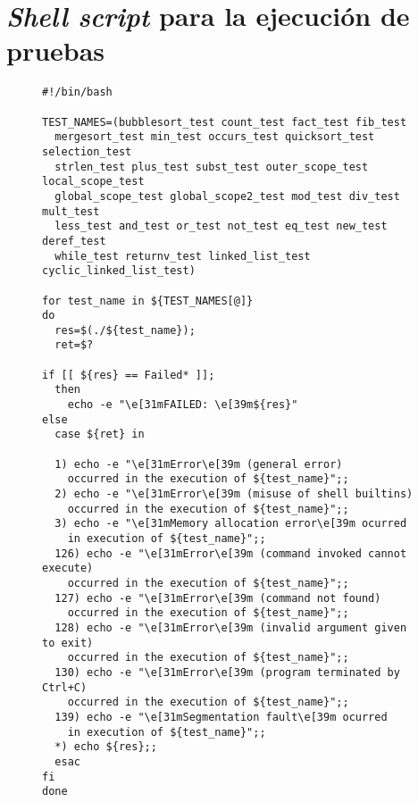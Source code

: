 \chapter{\textit{Shell script} para la ejecución de pruebas}
\label{ap:bash_script}

\begin{figure}
\begin{lstlisting}
#!/bin/bash

TEST_NAMES=(bubblesort_test count_test fact_test fib_test
  mergesort_test min_test occurs_test quicksort_test selection_test
  strlen_test plus_test subst_test outer_scope_test local_scope_test
  global_scope_test global_scope2_test mod_test div_test mult_test
  less_test and_test or_test not_test eq_test new_test deref_test
  while_test returnv_test linked_list_test cyclic_linked_list_test)

for test_name in ${TEST_NAMES[@]}
do
  res=$(./${test_name});
  ret=$?

if [[ ${res} == Failed* ]];
  then
    echo -e "\e[31mFAILED: \e[39m${res}"
else
  case ${ret} in

  1) echo -e "\e[31mError\e[39m (general error)
    occurred in the execution of ${test_name}";;
  2) echo -e "\e[31mError\e[39m (misuse of shell builtins)
    occurred in the execution of ${test_name}";;
  3) echo -e "\e[31mMemory allocation error\e[39m ocurred
    in execution of ${test_name}";;
  126) echo -e "\e[31mError\e[39m (command invoked cannot execute)
    occurred in the execution of ${test_name}";;
  127) echo -e "\e[31mError\e[39m (command not found)
    occurred in the execution of ${test_name}";;
  128) echo -e "\e[31mError\e[39m (invalid argument given to exit)
    occurred in the execution of ${test_name}";;
  130) echo -e "\e[31mError\e[39m (program terminated by Ctrl+C)
    occurred in the execution of ${test_name}";;
  139) echo -e "\e[31mSegmentation fault\e[39m ocurred
    in execution of ${test_name}";;
  *) echo ${res};;
  esac
fi
done
\end{lstlisting}
\end{figure}
